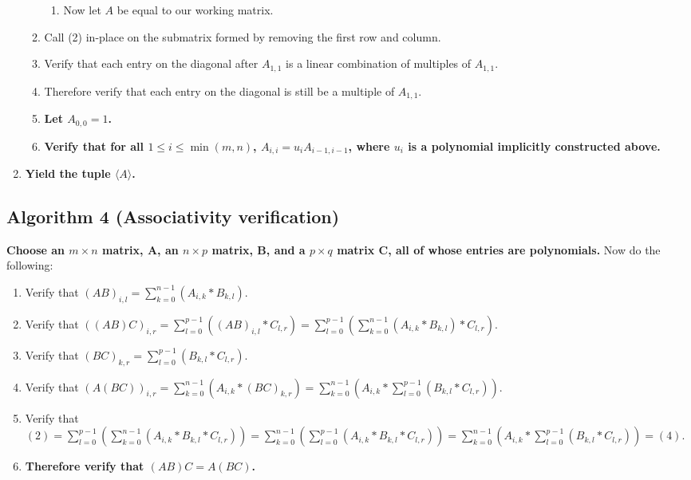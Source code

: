 \documentclass[twocolumn]{article}
\begin{document}
\begin{enumerate}
\begin{enumerate}
\begin{enumerate}
						\item Now let $A$ be equal to our working matrix.
					\end{enumerate}
					\item Call (2) in-place on the submatrix formed by removing the first row and column.
					\item Verify that each entry on the diagonal after $A_{1,1}$ is a linear combination of multiples of $A_{1,1}$.
					\item Therefore verify that each entry on the diagonal is still be a multiple of $A_{1,1}$.
					\item \textbf{Let $A_{0,0}=1$.}
					\item \textbf{Verify that for all $1\le i\le\min(m,n)$, $A_{i,i}=u_iA_{i-1,i-1}$, where $u_i$ is a polynomial implicitly constructed above.}
				\end{enumerate}
				\item \textbf{Yield the tuple $\langle A\rangle$.}
			\end{enumerate}
		\subsection{Algorithm 4 (Associativity verification)}\label{sec:algorithm 4}
			\textbf{Choose an $m\times n$ matrix, A, an $n\times p$ matrix, B, and a $p\times q$ matrix C, all of whose entries are polynomials.} Now do the following:
			\begin{enumerate}
				\item Verify that $(AB)_{i,l}=\sum_{k=0}^{n-1} \left(A_{i,k}*B_{k,l}\right)$.
				\item Verify that $((AB)C)_{i,r}=\sum_{l=0}^{p-1} \left((AB)_{i,l}*C_{l,r}\right)=\sum_{l=0}^{p-1} \left(\sum_{k=0}^{n-1} \left(A_{i,k}*B_{k,l}\right)*C_{l,r}\right)$.
				\item Verify that $(BC)_{k,r}=\sum_{l=0}^{p-1}\left(B_{k,l}*C_{l,r}\right)$.
				\item Verify that $(A(BC))_{i,r}=\sum_{k=0}^{n-1}\left(A_{i,k}*(BC)_{k,r}\right)=\sum_{k=0}^{n-1}\left(A_{i,k}*\sum_{l=0}^{p-1}\left(B_{k,l}*C_{l,r}\right)\right)$.
				\item Verify that $(2)=\sum_{l=0}^{p-1} \left(\sum_{k=0}^{n-1} \left(A_{i,k}*B_{k,l}*C_{l,r}\right)\right)=\sum_{k=0}^{n-1} \left(\sum_{l=0}^{p-1} \left(A_{i,k}*B_{k,l}*C_{l,r}\right)\right)=\sum_{k=0}^{n-1}\left(A_{i,k}*\sum_{l=0}^{p-1}\left(B_{k,l}*C_{l,r}\right)\right)=(4)$.
				\item \textbf{Therefore verify that $(AB)C=A(BC)$.}
			\end{enumerate}
\end{document}
